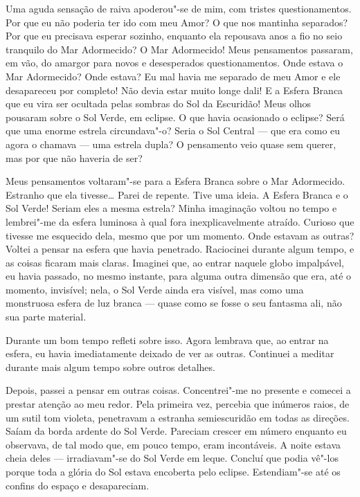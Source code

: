 Uma aguda sensação de raiva apoderou"-se de mim, com tristes questionamentos. Por que eu não poderia ter ido com
meu Amor? O que nos mantinha separados? Por que eu precisava esperar sozinho, enquanto ela repousava anos a fio no seio
tranquilo do Mar Adormecido? O Mar Adormecido! Meus pensamentos passaram, em vão, do amargor para novos e desesperados
questionamentos. Onde estava o Mar Adormecido? Onde estava? Eu mal havia me separado de meu Amor
e ele desapareceu por completo! Não devia estar muito longe dali! E a Esfera Branca que eu vira ser ocultada
pelas sombras do Sol da Escuridão! Meus olhos pousaram sobre o Sol Verde, em eclipse. O que havia ocasionado o eclipse?
Será que uma enorme estrela circundava"-o? Seria o Sol Central --- que era como eu agora o chamava --- uma estrela dupla? O
pensamento veio quase sem querer, mas por que não haveria de ser?

Meus pensamentos voltaram"-se para a Esfera Branca sobre o Mar Adormecido. Estranho que ela tivesse\ldots{} Parei de repente.
Tive uma ideia. A Esfera Branca e o Sol Verde! Seriam eles a mesma estrela? Minha imaginação voltou no tempo e
lembrei"-me da esfera luminosa à qual fora inexplicavelmente atraído. Curioso que tivesse me esquecido dela, mesmo que
por um momento. Onde estavam as outras? Voltei a pensar na esfera que havia penetrado. Raciocinei durante algum tempo, 
e as coisas ficaram mais claras. Imaginei que, ao entrar naquele globo impalpável, eu havia passado, no mesmo instante,
para alguma outra dimensão que era, até o momento, invisível; nela, o Sol Verde ainda era visível, mas como uma
monstruosa esfera de luz branca --- quase como se fosse o seu fantasma ali, não sua parte material.

Durante um bom tempo refleti sobre isso. Agora lembrava que, ao entrar na esfera, eu havia imediatamente deixado de ver
as outras. Continuei a meditar durante mais algum tempo sobre outros detalhes.

Depois, passei a pensar em outras coisas. Concentrei"-me no presente e comecei a prestar atenção ao meu redor. Pela
primeira vez, percebia que inúmeros raios, de um sutil tom violeta, penetravam a estranha semiescuridão em todas as
direções. Saíam da borda ardente do Sol Verde. Pareciam crescer em número enquanto eu observava, de tal modo que, em
pouco tempo, eram incontáveis. A noite estava cheia deles --- irradiavam"-se do Sol Verde em leque. Concluí que podia vê"-los
porque toda a glória do Sol estava encoberta pelo eclipse. Estendiam"-se até os confins do espaço e desapareciam.

